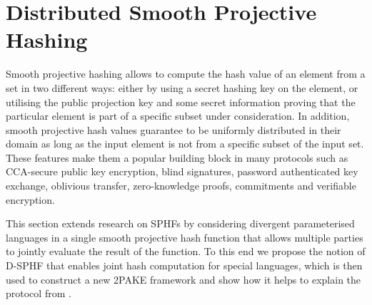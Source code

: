 \section{Distributed Smooth Projective Hashing} \label{sec:dsphf-2pake}

Smooth projective hashing allows to compute the hash value of an element from a set in two different ways:
either by using a secret hashing key on the element, or utilising the public projection key and some secret information proving that the particular element is part of a specific subset under consideration.
In addition, smooth projective hash values guarantee to be uniformly distributed in their domain as long as the input element is not from a specific subset of the input set.
These features make them a popular building block in many protocols such as \ac{CCA}-secure public key encryption, blind signatures, password authenticated key exchange, oblivious transfer, zero-knowledge proofs, commitments and verifiable encryption.

%

This section extends research on \aclp{SPHF} by considering divergent parameterised languages in a single smooth projective hash function that allows multiple parties to jointly evaluate the result of the function. 
To this end we propose the notion of \ac{D-SPHF} that enables joint hash computation for special languages, which is then used to construct a new \ac{2PAKE} framework and show how it helps to explain the protocol from \citet{Katz2012a}.


